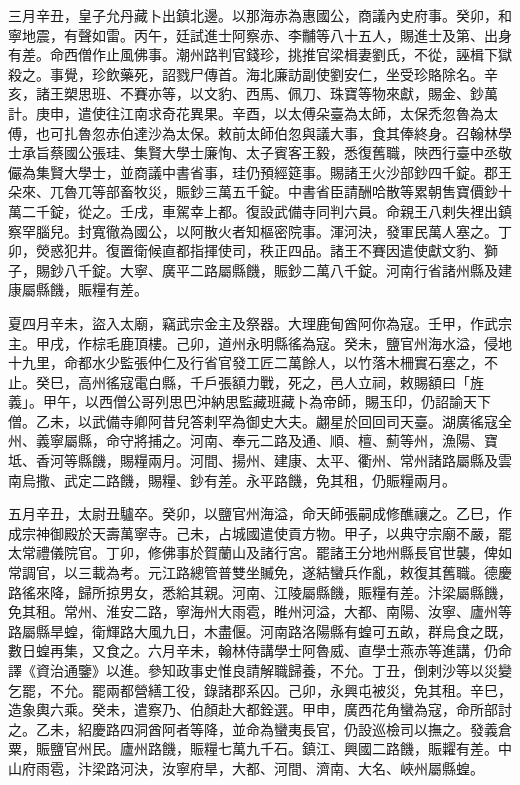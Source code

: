 \begin{pinyinscope}
 三月辛丑，皇子允丹藏卜出鎮北邊。以那海赤為惠國公，商議內史府事。癸卯，和寧地震，有聲如雷。丙午，廷試進士阿察赤、李黼等八十五人，賜進士及第、出身有差。命西僧作止風佛事。潮州路判官錢珍，挑推官梁楫妻劉氏，不從，誣楫下獄殺之。事覺，珍飲藥死，詔戮尸傳首。海北廉訪副使劉安仁，坐受珍賂除名。辛亥，諸王槊思班、不賽亦等，以文豹、西馬、佩刀、珠寶等物來獻，賜金、鈔萬計。庚申，遣使往江南求奇花異果。辛酉，以太傅朵臺為太師，太保禿忽魯為太傅，也可扎魯忽赤伯達沙為太保。敕前太師伯忽與議大事，食其俸終身。召翰林學士承旨蔡國公張珪、集賢大學士廉恂、太子賓客王毅，悉復舊職，陜西行臺中丞敬儼為集賢大學士，並商議中書省事，珪仍預經筵事。賜諸王火沙部鈔四千錠。郡王朵來、兀魯兀等部畜牧災，賑鈔三萬五千錠。中書省臣請酬哈散等累朝售寶價鈔十萬二千錠，從之。壬戌，車駕幸上都。復設武備寺同判六員。命親王八剌失裡出鎮察罕腦兒。封寬徹為國公，以阿散火者知樞密院事。渾河決，發軍民萬人塞之。丁卯，熒惑犯井。復置衛候直都指揮使司，秩正四品。諸王不賽因遣使獻文豹、獅子，賜鈔八千錠。大寧、廣平二路屬縣饑，賑鈔二萬八千錠。河南行省諸州縣及建康屬縣饑，賑糧有差。



 夏四月辛未，盜入太廟，竊武宗金主及祭器。大理鹿甸酋阿你為寇。壬甲，作武宗主。甲戌，作棕毛鹿頂樓。己卯，道州永明縣徭為寇。癸未，鹽官州海水溢，侵地十九里，命都水少監張仲仁及行省官發工匠二萬餘人，以竹落木柵實石塞之，不止。癸巳，高州徭寇電白縣，千戶張額力戰，死之，邑人立祠，敕賜額曰「旌義」。甲午，以西僧公哥列思巴沖納思監藏班藏卜為帝師，賜玉印，仍詔諭天下僧。乙未，以武備寺卿阿昔兒答剌罕為御史大夫。翽星於回回司天臺。湖廣徭寇全州、義寧屬縣，命守將捕之。河南、奉元二路及通、順、檀、薊等州，漁陽、寶坻、香河等縣饑，賜糧兩月。河間、揚州、建康、太平、衢州、常州諸路屬縣及雲南烏撒、武定二路饑，賜糧、鈔有差。永平路饑，免其租，仍賑糧兩月。



 五月辛丑，太尉丑驢卒。癸卯，以鹽官州海溢，命天師張嗣成修醮禳之。乙巳，作成宗神御殿於天壽萬寧寺。己未，占城國遣使貢方物。甲子，以典守宗廟不嚴，罷太常禮儀院官。丁卯，修佛事於賀蘭山及諸行宮。罷諸王分地州縣長官世襲，俾如常調官，以三載為考。元江路總管普雙坐贓免，遂結蠻兵作亂，敕復其舊職。德慶路徭來降，歸所掠男女，悉給其親。河南、江陵屬縣饑，賑糧有差。汴梁屬縣饑，免其租。常州、淮安二路，寧海州大雨雹，睢州河溢，大都、南陽、汝寧、廬州等路屬縣旱蝗，衛輝路大風九日，木盡偃。河南路洛陽縣有蝗可五畝，群烏食之既，數日蝗再集，又食之。六月辛未，翰林侍講學士阿魯威、直學士燕赤等進講，仍命譯《資治通鑒》以進。參知政事史惟良請解職歸養，不允。丁丑，倒剌沙等以災變乞罷，不允。罷兩都營繕工役，錄諸郡系囚。己卯，永興屯被災，免其租。辛巳，造象輿六乘。癸未，遣察乃、伯顏赴大都銓選。甲申，廣西花角蠻為寇，命所部討之。乙未，紹慶路四洞酋阿者等降，並命為蠻夷長官，仍設巡檢司以撫之。發義倉粟，賑鹽官州民。廬州路饑，賑糧七萬九千石。鎮江、興國二路饑，賑糶有差。中山府雨雹，汴梁路河決，汝寧府旱，大都、河間、濟南、大名、峽州屬縣蝗。




\end{pinyinscope}
